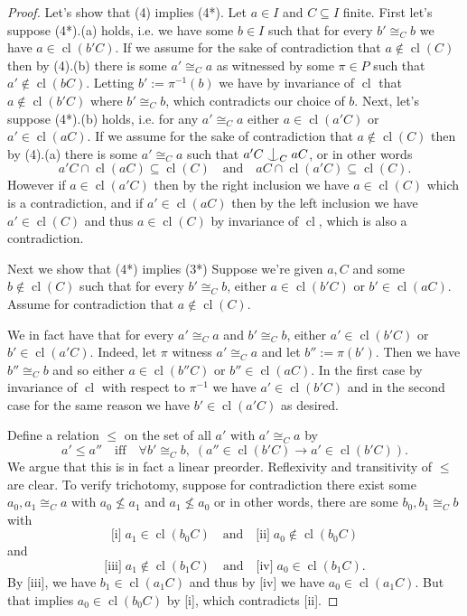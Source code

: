 \documentclass[10pt,a4paper]{amsart}
\DeclareMathOperator{\cl}{cl}
\newcommand{\forkindep}[1][]{%
  \mathrel{
    \mathop{
      \vcenter{
        \hbox{\oalign{\noalign{\kern-.3ex}\hfil$\vert$\hfil\cr
              \noalign{\kern-.7ex}
              $\smile$\cr\noalign{\kern-.3ex}}}
      }
    }\displaylimits_{#1}
  }
}
\newcommand{\isom}{\cong}
\begin{document}
\begin{proof}
Let's show that (4) implies (4*).
Let $a \in I$ and $C \subseteq I$ finite.
First let's suppose (4*).(a) holds, i.e. we have some $b \in I$ such that for every $b' \isom_C b$ we have $a \in \cl(b'C)$.
If we assume for the sake of contradiction that $a \not\in \cl(C)$ then by (4).(b) there is some $a' \isom_C a$ as witnessed by some $\pi \in P$ such that $a' \not\in \cl(bC)$.
Letting $b' := \pi^{-1}(b)$ we have by invariance of $\cl$ that $a \not\in \cl(b'C)$ where $b' \isom_C b$, which contradicts our choice of $b$.
Next, let's suppose (4*).(b) holds, i.e. for any $a' \isom_C a$ either $a \in \cl(a'C)$ or $a' \in \cl(aC)$.
If we assume for the sake of contradiction that $a \not\in \cl(C)$ then by (4).(a) there is some $a' \isom_C a$ such that $a'C \forkindep[C] aC$, or in other words
\[ a'C \cap \cl(aC) \subseteq \cl(C) \quad \text{and} \quad aC \cap \cl(a'C) \subseteq \cl(C). \]
However if $a \in \cl(a'C)$ then by the right inclusion we have $a \in \cl(C)$ which is a contradiction, and if $a' \in \cl(aC)$ then by the left inclusion we have $a' \in \cl(C)$ and thus $a \in \cl(C)$ by invariance of $\cl$, which is also a contradiction.

Next we show that (4*) implies (3*)
Suppose we're given $a, C$ and some $b \not\in \cl(C)$ such that for every $b' \isom_C b$, either $a \in \cl(b'C)$ or $b' \in \cl(aC)$. 
Assume for contradiction that $a \not\in \cl(C)$. 

We in fact have that for every $a' \isom_C a$ and $b' \isom_C b$, either $a' \in \cl(b'C)$ or $b' \in \cl(a'C)$.
Indeed, let $\pi$ witness $a' \isom_C a$ and let $b'' := \pi(b')$.
Then we have $b'' \isom_C b$ and so either $a \in \cl(b''C)$ or $b'' \in \cl(aC)$.
In the first case by invariance of $\cl$ with respect to $\pi^{-1}$ we have $a' \in \cl(b'C)$ and in the second case for the same reason we have $b' \in \cl(a'C)$ as desired.

Define a relation $\le$ on the set of all $a'$ with $a' \isom_C a$ by
\[ a' \le a'' \quad \text{iff} \quad \forall b' \isom_C b, \; (a'' \in \cl(b'C) \rightarrow a' \in \cl(b'C)). \]
We argue that this is in fact a linear preorder.
Reflexivity and transitivity of $\le$ are clear. 
To verify trichotomy, suppose for contradiction there exist some $a_0, a_1 \isom_C a$ with $a_0 \not\le a_1$ and $a_1 \not\le a_0$ or in other words, there are some $b_0, b_1 \isom_C b$ with 
\[\text{[i]} \; a_1 \in \cl(b_0C) \quad \text{and} \quad \text{[ii]} \; a_0 \not\in \cl(b_0C)\]
and 
\[\text{[iii]} \; a_1 \not\in \cl(b_1C) \quad \text{and} \quad \text{[iv]} \; a_0 \in \cl(b_1C).\]
By [iii], we have $b_1 \in \cl(a_1C)$ and thus by [iv] we have $a_0 \in \cl(a_1C)$. 
But that implies $a_0 \in \cl(b_0C)$ by [i], which contradicts [ii].


\end{proof}
\end{document}

